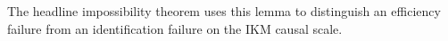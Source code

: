 The headline impossibility theorem uses this lemma to distinguish an efficiency failure from an identification failure on the IKM causal scale.